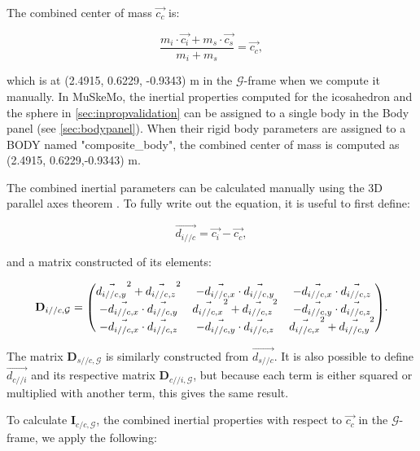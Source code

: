 \documentclass{article}
\begin{document}
The combined center of mass \(\vec{c_{c}}\) is:

\begin{equation}
    \frac{m_{i} \cdot \vec{c_{i}} + m_{s} \cdot \vec{c_{s}}}{m_{i} + m_{s}} = \vec{c_{c}},
\end{equation}

which is at (2.4915, 0.6229, -0.9343) \si{m} in the \(\mathcal{G}\)-frame when we compute it manually. In MuSkeMo, the inertial properties computed for the icosahedron and the sphere in \ref{sec:inpropvalidation} can be assigned to a single body in the Body panel (see \ref{sec:bodypanel}). When their rigid body parameters are assigned to a BODY named "composite\_body", the combined center of mass is computed as (2.4915, 0.6229,-0.9343) \si{m}. 

The combined inertial parameters can be calculated manually using the 3D parallel axes theorem \cite{valleryAdvancedDynamics2019,ruinaMechanicsToolsetStatics2019}. To fully write out the equation, it is useful to first define:

\begin{equation}
\vec{d_{i//c}} = \vec{c_i} - \vec{c_c},
\end{equation}

and a matrix constructed of its elements:

\begin{equation}
    \mathbf{D}_{i//c,\mathcal{G}} = \mqty(
        \vec{d_{i//c, y}}^2 + \vec{d_{i//c, z}}^2& - \vec{d_{i//c, x}} \cdot \vec{d_{i//c, y}} & - \vec{d_{i//c, x}} \cdot \vec{d_{i//c, z}} \\
        - \vec{d_{i//c, x}} \cdot \vec{d_{i//c, y}} &\vec{d_{i//c, x}}^2 + \vec{d_{i//c, z}}^2& - \vec{d_{i//c, y}} \cdot \vec{d_{i//c, z}}  \\
        - \vec{d_{i//c, x}} \cdot \vec{d_{i//c, z}}  & - \vec{d_{i//c, y}} \cdot \vec{d_{i//c, z}}  & \vec{d_{i//c, x}}^2 + \vec{d_{i//c, y}}^2
    ).
\end{equation}

The matrix \(\mathbf{D}_{s//c,\mathcal{G}}\) is similarly constructed from \(\vec{{d_{s//c}}}\). It is also possible to define \(\vec{d_{c//i}}\) and its respective matrix \(\mathbf{D}_{c//i,\mathcal{G}}\), but because each term is either squared or multiplied with another term, this gives the same result.

To calculate \(\mathbf{I}_{c/c,{\mathcal{G}}}\), the combined inertial properties with respect to \(\vec{c_c}\) in the \(\mathcal{G}\)-frame, we apply the following:
\end{document}
